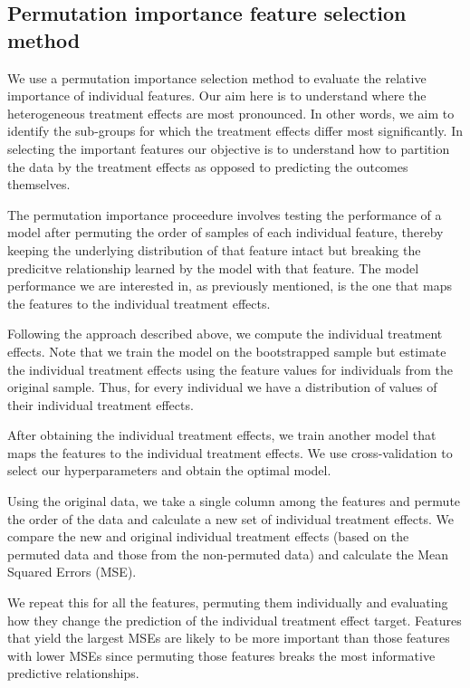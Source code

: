 \documentclass[12pt, a4paper]{article}
\begin{document}
\subsection{Permutation importance feature selection method}

We use a permutation importance selection method \citep{breiman2001,molnar2020}
to evaluate the relative importance of individual features. Our aim here is to
understand where the heterogeneous treatment effects are most pronounced. In
other words, we aim to identify the sub-groups for which the treatment effects
differ most significantly. In selecting the important features our objective is
to understand how to partition the data by the treatment effects as opposed to
predicting the outcomes themselves. 

The permutation importance proceedure involves testing the performance of a
model after permuting the order of samples of each individual feature, thereby
keeping the underlying distribution of that feature intact but breaking the
predicitve relationship learned by the model with that feature. The model
performance we are interested in, as previously mentioned, is the one that maps
the features to the individual treatment effects. 

Following the approach described above, we compute the individual treatment effects. Note that
we train the model on the bootstrapped sample but estimate the individual
treatment effects using the feature values for individuals from the original
sample. Thus, for every individual we have a distribution of values of their
individual treatment effects.

After obtaining the individual treatment effects, we train another model that
maps the features to the individual treatment effects. We use cross-validation
to select our hyperparameters and obtain the optimal model. 

Using the original data, we take a single column among the features and
permute the order of the data and calculate a new set of individual treatment
effects. We compare the new and original individual treatment effects (based on
the permuted data and those from the non-permuted data) and calculate the Mean
Squared Errors (MSE). 

We repeat this for all the features, permuting them individually and evaluating
how they change the prediction of the individual treatment effect target.
Features that yield the largest MSEs are likely to be more important than those
features with lower MSEs since permuting those features breaks the
most informative predictive relationships. 
\end{document}
